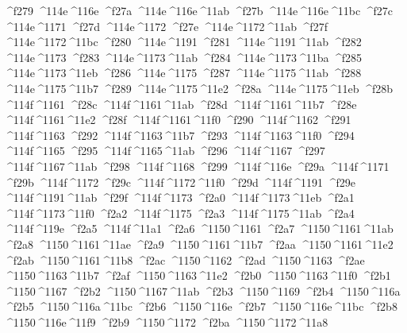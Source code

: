 \checkit ^^^^f279 ^^^^114e^^^^116e
\checkit ^^^^f27a ^^^^114e^^^^116e^^^^11ab
\checkit ^^^^f27b ^^^^114e^^^^116e^^^^11bc
\checkit ^^^^f27c ^^^^114e^^^^1171
\checkit ^^^^f27d ^^^^114e^^^^1172
\checkit ^^^^f27e ^^^^114e^^^^1172^^^^11ab
\checkit ^^^^f27f ^^^^114e^^^^1172^^^^11bc
\checkit ^^^^f280 ^^^^114e^^^^1191
\checkit ^^^^f281 ^^^^114e^^^^1191^^^^11ab
\checkit ^^^^f282 ^^^^114e^^^^1173
\checkit ^^^^f283 ^^^^114e^^^^1173^^^^11ab
\checkit ^^^^f284 ^^^^114e^^^^1173^^^^11ba
\checkit ^^^^f285 ^^^^114e^^^^1173^^^^11eb
\checkit ^^^^f286 ^^^^114e^^^^1175
\checkit ^^^^f287 ^^^^114e^^^^1175^^^^11ab
\checkit ^^^^f288 ^^^^114e^^^^1175^^^^11b7
\checkit ^^^^f289 ^^^^114e^^^^1175^^^^11e2
\checkit ^^^^f28a ^^^^114e^^^^1175^^^^11eb
\checkit ^^^^f28b ^^^^114f^^^^1161
\checkit ^^^^f28c ^^^^114f^^^^1161^^^^11ab
\checkit ^^^^f28d ^^^^114f^^^^1161^^^^11b7
\checkit ^^^^f28e ^^^^114f^^^^1161^^^^11e2
\checkit ^^^^f28f ^^^^114f^^^^1161^^^^11f0
\checkit ^^^^f290 ^^^^114f^^^^1162
\checkit ^^^^f291 ^^^^114f^^^^1163
\checkit ^^^^f292 ^^^^114f^^^^1163^^^^11b7
\checkit ^^^^f293 ^^^^114f^^^^1163^^^^11f0
\checkit ^^^^f294 ^^^^114f^^^^1165
\checkit ^^^^f295 ^^^^114f^^^^1165^^^^11ab
\checkit ^^^^f296 ^^^^114f^^^^1167
\checkit ^^^^f297 ^^^^114f^^^^1167^^^^11ab
\checkit ^^^^f298 ^^^^114f^^^^1168
\checkit ^^^^f299 ^^^^114f^^^^116e
\checkit ^^^^f29a ^^^^114f^^^^1171
\checkit ^^^^f29b ^^^^114f^^^^1172
\checkit ^^^^f29c ^^^^114f^^^^1172^^^^11f0
\checkit ^^^^f29d ^^^^114f^^^^1191
\checkit ^^^^f29e ^^^^114f^^^^1191^^^^11ab
\checkit ^^^^f29f ^^^^114f^^^^1173
\checkit ^^^^f2a0 ^^^^114f^^^^1173^^^^11eb
\checkit ^^^^f2a1 ^^^^114f^^^^1173^^^^11f0
\checkit ^^^^f2a2 ^^^^114f^^^^1175
\checkit ^^^^f2a3 ^^^^114f^^^^1175^^^^11ab
\checkit ^^^^f2a4 ^^^^114f^^^^119e
\checkit ^^^^f2a5 ^^^^114f^^^^11a1
\checkit ^^^^f2a6 ^^^^1150^^^^1161
\checkit ^^^^f2a7 ^^^^1150^^^^1161^^^^11ab
\checkit ^^^^f2a8 ^^^^1150^^^^1161^^^^11ae
\checkit ^^^^f2a9 ^^^^1150^^^^1161^^^^11b7
\checkit ^^^^f2aa ^^^^1150^^^^1161^^^^11e2
\checkit ^^^^f2ab ^^^^1150^^^^1161^^^^11b8
\checkit ^^^^f2ac ^^^^1150^^^^1162
\checkit ^^^^f2ad ^^^^1150^^^^1163
\checkit ^^^^f2ae ^^^^1150^^^^1163^^^^11b7
\checkit ^^^^f2af ^^^^1150^^^^1163^^^^11e2
\checkit ^^^^f2b0 ^^^^1150^^^^1163^^^^11f0
\checkit ^^^^f2b1 ^^^^1150^^^^1167
\checkit ^^^^f2b2 ^^^^1150^^^^1167^^^^11ab
\checkit ^^^^f2b3 ^^^^1150^^^^1169
\checkit ^^^^f2b4 ^^^^1150^^^^116a
\checkit ^^^^f2b5 ^^^^1150^^^^116a^^^^11bc
\checkit ^^^^f2b6 ^^^^1150^^^^116e
\checkit ^^^^f2b7 ^^^^1150^^^^116e^^^^11bc
\checkit ^^^^f2b8 ^^^^1150^^^^116e^^^^11f9
\checkit ^^^^f2b9 ^^^^1150^^^^1172
\checkit ^^^^f2ba ^^^^1150^^^^1172^^^^11a8

